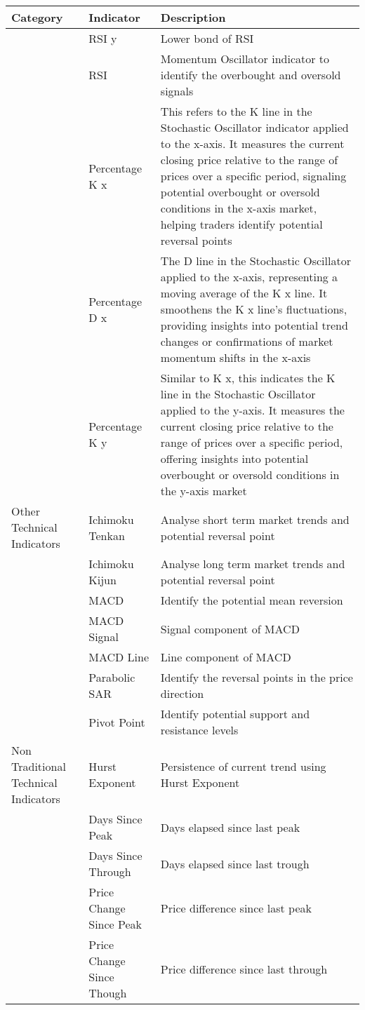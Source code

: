 \documentclass{article}
\begin{document}
\begin{table}[h!]
\centering
\begin{tabular}{|p{2cm}|p{4cm}|p{6cm}|}
\hline
\textbf{Category} & \textbf{Indicator} & {Description}\\
\hline
{} & RSI y & Lower bond of RSI \\
\hline
{} & RSI & Momentum Oscillator indicator to identify the overbought and oversold signals \\
\hline
{} & Percentage K x & This refers to the K line in the Stochastic Oscillator indicator applied to the x-axis. It measures the current closing price relative to the range of prices over a specific period, signaling potential overbought or oversold conditions in the x-axis market, helping traders identify potential reversal points \\
\hline
{} & Percentage D x & The D line in the Stochastic Oscillator applied to the x-axis, representing a moving average of the K x line. It smoothens the K x line's fluctuations, providing insights into potential trend changes or confirmations of market momentum shifts in the x-axis \\
\hline
{} & Percentage K y & Similar to K x, this indicates the K line in the Stochastic Oscillator applied to the y-axis. It measures the current closing price relative to the range of prices over a specific period, offering insights into potential overbought or oversold conditions in the y-axis market \\
\hline
Other Technical Indicators & Ichimoku Tenkan & Analyse short term market trends and potential reversal point \\
\hline
{} & Ichimoku Kijun & Analyse long term market trends and potential reversal point \\
\hline
{} & MACD & Identify the potential mean reversion \\
\hline
{} & MACD Signal & Signal component of MACD \\
\hline
{} & MACD Line & Line component of MACD \\
\hline
{} & Parabolic SAR & Identify the reversal points in the price direction \\
\hline
{} & Pivot Point & Identify potential support and resistance levels \\
\hline
Non Traditional Technical Indicators & Hurst Exponent & Persistence of current trend using Hurst Exponent \\
\hline
{} & Days Since Peak & Days elapsed since last peak \\
\hline
{} & Days Since Through & Days elapsed since last trough \\
\hline
{} & Price Change Since Peak & Price difference since last peak \\
\hline
{} & Price Change Since Though & Price difference since last through \\
\hline
\end{tabular}
\end{table}
\end{document}
